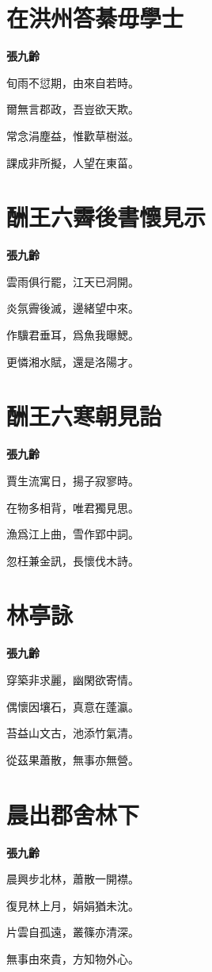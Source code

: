 \documentclass[12pt,a4paper]{ctexbook}
\begin{document}
\section{在洪州答綦毋學士}
\textbf{張九齡}\par\vspace{0.5em}
旬雨不愆期，由來自若時。\par
爾無言郡政，吾豈欲天欺。\par
常念涓塵益，惟歡草樹滋。\par
課成非所擬，人望在東菑。\par

\section{酬王六霽後書懷見示}
\textbf{張九齡}\par\vspace{0.5em}
雲雨俱行罷，江天已洞開。\par
炎氛霽後滅，邊緒望中來。\par
作驥君垂耳，爲魚我曝鰓。\par
更憐湘水賦，還是洛陽才。\par

\section{酬王六寒朝見詒}
\textbf{張九齡}\par\vspace{0.5em}
賈生流寓日，揚子寂寥時。\par
在物多相背，唯君獨見思。\par
漁爲江上曲，雪作郢中詞。\par
忽枉兼金訊，長懷伐木詩。\par

\section{林亭詠}
\textbf{張九齡}\par\vspace{0.5em}
穿築非求麗，幽閑欲寄情。\par
偶懷因壤石，真意在蓬瀛。\par
苔益山文古，池添竹氣清。\par
從茲果蕭散，無事亦無營。\par

\section{晨出郡舍林下}
\textbf{張九齡}\par\vspace{0.5em}
晨興步北林，蕭散一開襟。\par
復見林上月，娟娟猶未沈。\par
片雲自孤遠，叢篠亦清深。\par
無事由來貴，方知物外心。\par
\end{document}

